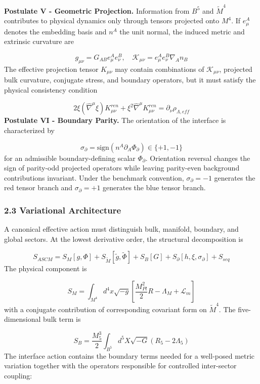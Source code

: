 \documentclass[aps,prd,onecolumn,superscriptaddress,nofootinbib,longbibliography,10pt]{revtex4-2}
\begin{document}
  \textbf{Postulate V - Geometric Projection.} Information from \(B^5\) and \(\tilde{M}^4\) contributes to physical dynamics only through tensors projected onto \(M^4\). If \(e^A_\mu\) denotes the embedding basis and \(n^A\) the unit normal, the induced metric and extrinsic curvature are


  \[ g_{\mu\nu} = G_{AB} e^A_\mu e^B_\nu, \quad \mathcal{K}_{\mu\nu} = e^A_\mu e^B_\nu \nabla_A n_B \]
  The effective projection tensor \(K_{\mu\nu}\) may contain combinations of \(\mathcal{K}_{\mu\nu}\), projected bulk curvature, conjugate stress, and boundary operators, but it must satisfy the physical consistency condition


  \[ 2\xi(\hat{\nabla}^\mu \xi) K^{ren}_{\mu\nu} + \xi^2 \hat{\nabla}^\mu K^{ren}_{\mu\nu} = \partial_\nu \rho_{\Lambda,eff} \]
  \textbf{Postulate VI - Boundary Parity.} The orientation of the interface is characterized by


  \[ \sigma_\partial = \text{sign}(n^A \partial_A \Phi_\partial) \in \{+1, -1\} \]
  for an admissible boundary-defining scalar \(\Phi_\partial\). Orientation reversal changes the sign of parity-odd projected operators while leaving parity-even background contributions invariant. Under the benchmark convention, \(\sigma_\partial = -1\) generates the red tensor branch and \(\sigma_\partial = +1\) generates the blue tensor branch.



  
\subsubsection*{2.3 Variational Architecture}

  A canonical effective action must distinguish bulk, manifold, boundary, and global sectors. At the lowest derivative order, the structural decomposition is


  \[ S_{ASCM} = S_M[g,\Phi] + S_{\tilde{M}}[\tilde{g},\tilde{\Phi}] + S_B[G] + S_\partial[h,\xi,\sigma_\partial] + S_{seq} \]
  The physical component is


  \[ S_M = \int_{M^4} d^4x \sqrt{-g} \left[ \frac{M_{Pl}^2}{2} R - \Lambda_M + \mathcal{L}_m \right] \]
  with a conjugate contribution of corresponding covariant form on \(\tilde{M}^4\). The five-dimensional bulk term is


  \[ S_B = \frac{M_5^3}{2} \int_{B^5} d^5X \sqrt{-G} (R_5 - 2\Lambda_5) \]
  The interface action contains the boundary terms needed for a well-posed metric variation together with the operators responsible for controlled inter-sector coupling:
\end{document}
